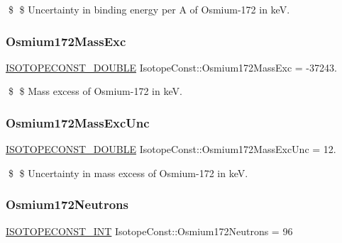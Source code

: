 \$ \$ Uncertainty in binding energy per A of Osmium-\/172 in keV. \mbox{\label{group___isotope_const-_osmium-_os172_ga413586fa48d9415c2a27f331ef1e5e4d}} 
\subsubsection{\texorpdfstring{Osmium172\+Mass\+Exc}{Osmium172MassExc}}
{\footnotesize\ttfamily \mbox{\hyperlink{group___isotope_const-_macros_ga8f45a7272ce02c0b4c65c44636ed719a}{I\+S\+O\+T\+O\+P\+E\+C\+O\+N\+S\+T\+\_\+\+D\+O\+U\+B\+LE}} Isotope\+Const\+::\+Osmium172\+Mass\+Exc = -\/37243.}

\$ \$ Mass excess of Osmium-\/172 in keV. \mbox{\label{group___isotope_const-_osmium-_os172_gad5ff8c127d2d7942b991e241ebb14b02}} 
\subsubsection{\texorpdfstring{Osmium172\+Mass\+Exc\+Unc}{Osmium172MassExcUnc}}
{\footnotesize\ttfamily \mbox{\hyperlink{group___isotope_const-_macros_ga8f45a7272ce02c0b4c65c44636ed719a}{I\+S\+O\+T\+O\+P\+E\+C\+O\+N\+S\+T\+\_\+\+D\+O\+U\+B\+LE}} Isotope\+Const\+::\+Osmium172\+Mass\+Exc\+Unc = 12.}

\$ \$ Uncertainty in mass excess of Osmium-\/172 in keV. \mbox{\label{group___isotope_const-_osmium-_os172_gadf8f76ece29f61449b9cf19982bde7fa}} 
\subsubsection{\texorpdfstring{Osmium172\+Neutrons}{Osmium172Neutrons}}
{\footnotesize\ttfamily \mbox{\hyperlink{group___isotope_const-_macros_ga5f18360b3e99483a35c32d789e62621c}{I\+S\+O\+T\+O\+P\+E\+C\+O\+N\+S\+T\+\_\+\+I\+NT}} Isotope\+Const\+::\+Osmium172\+Neutrons = 96}


